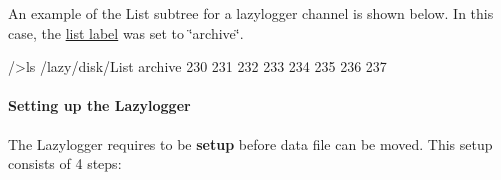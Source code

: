 An example of the List subtree for a lazylogger channel is shown below. In this case, the \hyperlink{F_LogUtil_F_Lazy_list_label}{list label} was set to \char`\"{}archive\char`\"{}.


\begin{DoxyCode}
/>ls /lazy/disk/List
archive
                                230
                                231
                                232
                                233
                                234
                                235
                                236
                                237
\end{DoxyCode}


\par


\par
\hypertarget{F_LogUtil_F_ODB_Lazy_setup}{}\paragraph{Setting up the Lazylogger}\label{F_LogUtil_F_ODB_Lazy_setup}
The Lazylogger requires to be {\bfseries setup} before data file can be moved. This setup consists of 4 steps:


